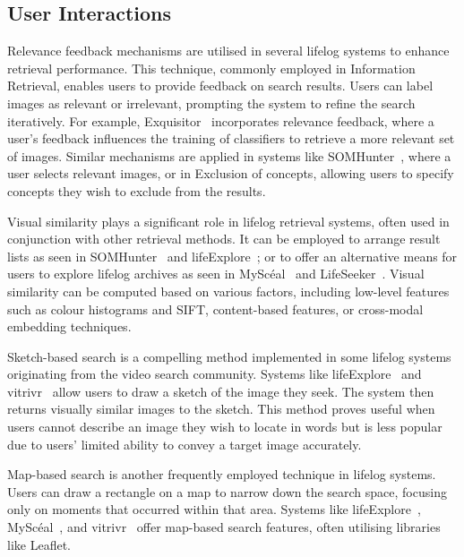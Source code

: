 \documentclass[11pt]{article}
\newcommand{\mysceal}{MySc{\'e}al}
\begin{document}
\subsection{User Interactions}
Relevance feedback mechanisms are utilised in several lifelog systems to enhance retrieval performance. This technique, commonly employed in Information Retrieval, enables users to provide feedback on search results. Users can label images as relevant or irrelevant, prompting the system to refine the search iteratively. For example, Exquisitor~\cite{khan2021exquisitor} incorporates relevance feedback, where a user's feedback influences the training of classifiers to retrieve a more relevant set of images. Similar mechanisms are applied in systems like SOMHunter~\cite{lokovc2021enhanced}, where a user selects relevant images, or in Exclusion of concepts, allowing users to specify concepts they wish to exclude from the results.

Visual similarity plays a significant role in lifelog retrieval systems, often used in conjunction with other retrieval methods. It can be employed to arrange result lists as seen in SOMHunter~\cite{lokovc2021enhanced} and lifeExplore~\cite{schoeffmann2023lifexplore}; or to offer an alternative means for users to explore lifelog archives as seen in \mysceal~\cite{emysceal2022} and LifeSeeker~\cite{nguyen2023lifeseeker}. Visual similarity can be computed based on various factors, including low-level features such as colour histograms and SIFT, content-based features, or cross-modal embedding techniques.

Sketch-based search is a compelling method implemented in some lifelog systems originating from the video search community. Systems like lifeExplore~\cite{schoeffmann2023lifexplore} and vitrivr~\cite{spiess2023best} allow users to draw a sketch of the image they seek. The system then returns visually similar images to the sketch. This method proves useful when users cannot describe an image they wish to locate in words but is less popular due to users' limited ability to convey a target image accurately.

Map-based search is another frequently employed technique in lifelog systems. Users can draw a rectangle on a map to narrow down the search space, focusing only on moments that occurred within that area. Systems like lifeExplore~\cite{schoeffmann2023lifexplore}, \mysceal~\cite{emysceal2022}, and vitrivr~\cite{spiess2023best} offer map-based search features, often utilising libraries like Leaflet.
\end{document}
